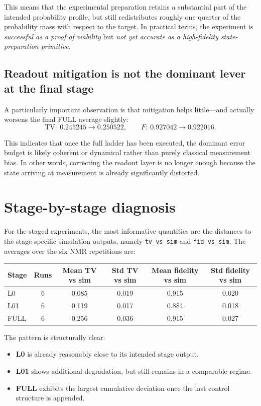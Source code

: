 \documentclass[11pt]{article}
\begin{document}
This means that the experimental preparation retains a substantial part of the intended probability profile, but still redistributes roughly one quarter of the probability mass with respect to the target. In practical terms, the experiment is \emph{successful as a proof of viability} but \emph{not yet accurate as a high-fidelity state-preparation primitive}.

\subsection{Readout mitigation is not the dominant lever at the final stage}

A particularly important observation is that mitigation helps little---and actually worsens the final FULL average slightly:
\[
\mathrm{TV}:~ 0.245245 \to 0.250522,
\qquad
F:~ 0.927042 \to 0.922016.
\]

This indicates that once the full ladder has been executed, the dominant error budget is likely coherent or dynamical rather than purely classical measurement bias. In other words, correcting the readout layer is no longer enough because the state arriving at measurement is already significantly distorted.

\section{Stage-by-stage diagnosis}

For the staged experiments, the most informative quantities are the distances to the stage-specific simulation outputs, namely \texttt{tv\_vs\_sim} and \texttt{fid\_vs\_sim}. The averages over the six NMR repetitions are:

\begin{center}
\begin{tabular}{lccccc}
\toprule
Stage & Runs & Mean TV vs sim & Std TV vs sim & Mean fidelity vs sim & Std fidelity vs sim \\
\midrule
L0 & 6 & 0.085 & 0.019 & 0.915 & 0.020 \\
L01 & 6 & 0.119 & 0.017 & 0.884 & 0.018 \\
FULL & 6 & 0.256 & 0.036 & 0.915 & 0.027 \\
\bottomrule
\end{tabular}
\end{center}

The pattern is structurally clear:
\begin{itemize}
\item \textbf{L0} is already reasonably close to its intended stage output.
\item \textbf{L01} shows additional degradation, but still remains in a comparable regime.
\item \textbf{FULL} exhibits the largest cumulative deviation once the last control structure is appended.
\end{itemize}
\end{document}
